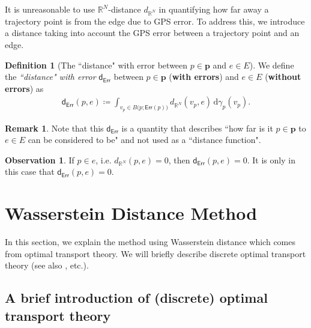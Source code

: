 \documentclass{article}
\numberwithin{equation}{section}
\theoremstyle{definition}
\newtheorem{definition}{Definition}[section]
\newtheorem{remark}[remark]{Remark}
\newtheorem{observation}[observation]{Observation}
\newcommand{\dd}{\mathrm{d}}
\newcommand{\derr}{\mathsf{d}_{\mathsf{Err}}}
\newcommand{\err}{\mathsf{Err}}
\newcommand{\R}{\mathbb{R}}
\def\:={\coloneqq} %
\begin{document}
It is unreasonable to use $\R^N$-distance $d_{\R^N}$ in quantifying how far away a trajectory point is from the edge due to GPS error.
To address this, we introduce a distance taking into account the GPS error between a trajectory point and an edge.

\begin{definition}[The ``distance" with error between $p\in\mathbf{p}$ and $e\in E$] \label{derr}
We define the \emph{``distance" with error} $\derr$ between $p\in\mathbf{p}$ (\textbf{with errors}) and $e\in E$ (\textbf{without errors}) as 
\begin{align*}
    \derr(p,e) \:= \int_{v_p\in B\big(p;\err(p)\big)} d_{\R^N}(v_p,e)\, \dd\gamma_p(v_p).
\end{align*}
\end{definition}

\begin{remark}
Note that this $\derr$ is a quantity that describes ``how far is it $p\in\mathbf{p}$ to $e\in E$ can be considered to be" and not used as a ``distance function".
\end{remark}

\begin{observation}
If $p\in e$, i.e. $d_{\R^N}(p,e)=0$, then $\derr(p,e)=0$.
It is only in this case that $\derr(p,e)=0$.
\end{observation}


\section{Wasserstein Distance Method} \label{Wasserstein method}

In this section, we explain the method using Wasserstein distance which comes from optimal transport theory.
We will briefly describe discrete optimal transport theory (see also \cite{FG,Sa,Vi}, etc.).

\subsection{A brief introduction of (discrete) optimal transport theory} \label{IntroOfOT}
\end{document}
